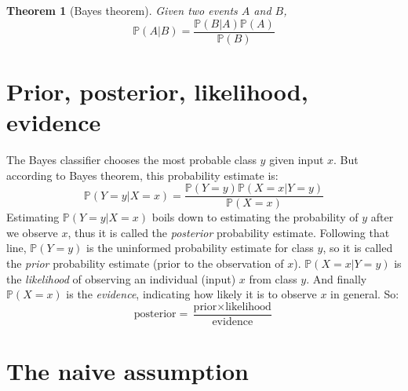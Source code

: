 \documentclass{article}
\newtheorem*{theorem}{Theorem}
\begin{document}
\begin{theorem}[Bayes theorem]
Given two events $A$ and $B$,
\begin{equation*}
\mathbb{P}(A|B) = \frac{\mathbb{P}(B|A) \mathbb{P}(A)}{\mathbb{P}(B)}
\end{equation*}
\end{theorem}

\section*{Prior, posterior, likelihood, evidence}

The Bayes classifier chooses the most probable class $y$ given input $x$. But according to Bayes theorem, this probability estimate is:
\begin{equation*}
\mathbb{P}(Y=y|X=x) = \frac{\mathbb{P}(Y=y)\mathbb{P}(X=x|Y=y)}{\mathbb{P}(X=x)}
\end{equation*}
Estimating $\mathbb{P}(Y=y|X=x)$ boils down to estimating the probability of $y$ after we observe $x$, thus it is called the \emph{posterior} probability estimate. Following that line, $\mathbb{P}(Y=y)$ is the uninformed probability estimate for class $y$, so it is called the \emph{prior} probability estimate (prior to the observation of $x$). $\mathbb{P}(X=x|Y=y)$ is the \emph{likelihood} of observing an individual (input) $x$ from class $y$. And finally $\mathbb{P}(X=x)$ is the \emph{evidence}, indicating how likely it is to observe $x$ in general. So:
\begin{equation*}
\text{posterior} = \frac{\text{prior}\times\text{likelihood}}{\text{evidence}}
\end{equation*}

\section*{The naive assumption}
\end{document}
